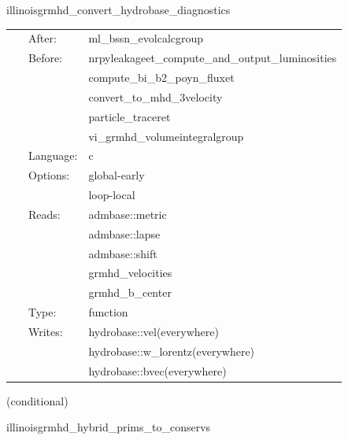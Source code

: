 \hspace{5mm} illinoisgrmhd\_convert\_hydrobase\_diagnostics 

\hspace{5mm}{\it convert illinoisgrmhd-native variables to hydrobase } 


\hspace{5mm}

 \begin{tabular*}{160mm}{cll} 
~ & After:  & ml\_bssn\_evolcalcgroup \\ 
~ & Before:  & nrpyleakageet\_compute\_and\_output\_luminosities \\ 
~& ~ &compute\_bi\_b2\_poyn\_fluxet\\ 
~& ~ &convert\_to\_mhd\_3velocity\\ 
~& ~ &particle\_traceret\\ 
~& ~ &vi\_grmhd\_volumeintegralgroup\\ 
~ & Language:  & c \\ 
~ & Options:  & global-early \\ 
~& ~ &loop-local\\ 
~ & Reads:  & admbase::metric \\ 
~& ~ &admbase::lapse\\ 
~& ~ &admbase::shift\\ 
~& ~ &grmhd\_velocities\\ 
~& ~ &grmhd\_b\_center\\ 
~ & Type:  & function \\ 
~ & Writes:  & hydrobase::vel(everywhere) \\ 
~& ~ &hydrobase::w\_lorentz(everywhere)\\ 
~& ~ &hydrobase::bvec(everywhere)\\ 
\end{tabular*} 


\vspace{5mm}

   (conditional) 

\hspace{5mm} illinoisgrmhd\_hybrid\_prims\_to\_conservs 

\hspace{5mm}{\it hybrid version of illinoisgrmhd\_prims\_to\_conservs } 


\hspace{5mm}

